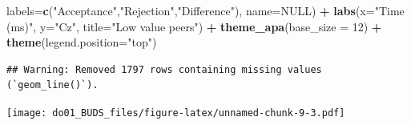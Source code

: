 \documentclass[
]{article}
\newenvironment{Shaded}{\begin{snugshade}}{\end{snugshade}}
\newcommand{\AttributeTok}[1]{\textcolor[rgb]{0.13,0.29,0.53}{#1}}
\newcommand{\ConstantTok}[1]{\textcolor[rgb]{0.56,0.35,0.01}{#1}}
\newcommand{\DecValTok}[1]{\textcolor[rgb]{0.00,0.00,0.81}{#1}}
\newcommand{\FunctionTok}[1]{\textcolor[rgb]{0.13,0.29,0.53}{\textbf{#1}}}
\newcommand{\NormalTok}[1]{#1}
\newcommand{\SpecialCharTok}[1]{\textcolor[rgb]{0.81,0.36,0.00}{\textbf{#1}}}
\newcommand{\StringTok}[1]{\textcolor[rgb]{0.31,0.60,0.02}{#1}}
\begin{document}
\begin{Shaded}
\begin{Highlighting}[]
                     \AttributeTok{labels=}\FunctionTok{c}\NormalTok{(}\StringTok{"Acceptance"}\NormalTok{,}\StringTok{"Rejection"}\NormalTok{,}\StringTok{"Difference"}\NormalTok{), }\AttributeTok{name=}\ConstantTok{NULL}\NormalTok{) }\SpecialCharTok{+}
  \FunctionTok{labs}\NormalTok{(}\AttributeTok{x=}\StringTok{"Time (ms)"}\NormalTok{, }\AttributeTok{y=}\StringTok{"Cz"}\NormalTok{, }\AttributeTok{title=}\StringTok{"Low value peers"}\NormalTok{) }\SpecialCharTok{+}
  \FunctionTok{theme\_apa}\NormalTok{(}\AttributeTok{base\_size =} \DecValTok{12}\NormalTok{) }\SpecialCharTok{+} \FunctionTok{theme}\NormalTok{(}\AttributeTok{legend.position=}\StringTok{"top"}\NormalTok{)}
\end{Highlighting}
\end{Shaded}

\begin{verbatim}
## Warning: Removed 1797 rows containing missing values (`geom_line()`).
\end{verbatim}

\texttt{[image: do01\_BUDS\_files/figure-latex/unnamed-chunk-9-3.pdf]}
\end{document}
